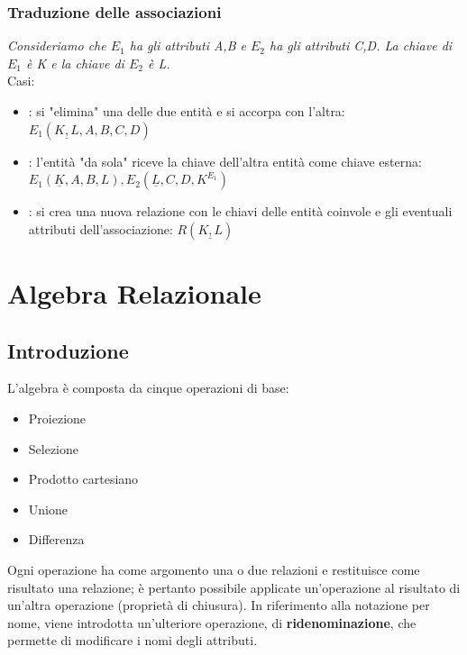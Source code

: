 \documentclass[12pt, a4paper]{report}
\begin{document}
    \subsection{Traduzione delle associazioni}
    \begin{center}
    \end{center}
    \textit{Consideriamo che $E_{1}$ ha gli attributi A,B e $E_{2}$ ha gli attributi C,D. La chiave di $E_{1}$ è K e la chiave di $E_{2}$ è L.}\\
    Casi:
    \begin{itemize}
        \item {}: si "elimina" una delle due entità e si accorpa con l'altra: $E_{1}(\underline{K,L},A,B,C,D)$
        \item {}: l'entità "da sola" riceve la chiave dell'altra entità come chiave esterna: $E_{1}(\underline{K},A,B,L),E_{2}(\underline{L},C,D, K^{E_{1}})$
        \item {}: si crea una nuova relazione con le chiavi delle entità coinvole e gli eventuali attributi dell'associazione: $R(\underline{K,L})$
    \end{itemize}
    \chapter{Algebra Relazionale}
    \section{Introduzione}
    L'algebra è composta da cinque operazioni di base:
    \begin{itemize}
        \item Proiezione
        \item Selezione
        \item Prodotto cartesiano
        \item Unione
        \item Differenza
    \end{itemize}
    Ogni operazione ha come argomento una o due relazioni e restituisce come risultato una relazione; è pertanto possibile applicate un'operazione al risultato di un'altra operazione (proprietà di chiusura). In riferimento alla notazione per nome, viene introdotta un'ulteriore operazione, di \textbf{ridenominazione}, che permette di modificare i nomi degli attributi.
\end{document}
